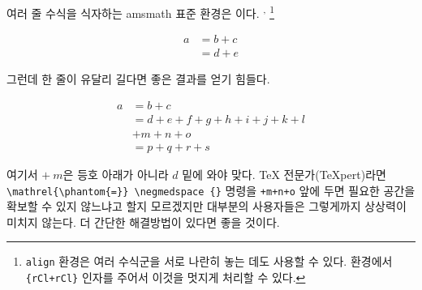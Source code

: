 여러 줄 수식을 식자하는 \textsf{amsmath} 표준 환경은 이다.%
%
\textsuperscript{,}%
\footnote{%
  \texttt{align} 환경은 여러 수식군을 서로 나란히 놓는 데도 사용할 수 있다.
   환경에서 \texttt{\{rCl+rCl\}} 인자를 주어서 이것을 멋지게 처리할 수 있다.
}
\begin{examplek}
\begin{align}
  a & = b + c \\
  & = d + e
\end{align}
\end{examplek}

그런데 한 줄이 유달리 길다면 좋은 결과를 얻기 힘들다.
\begin{examplek}
\begin{align}
  a & = b + c \\
  & = d + e + f + g + h + i 
  + j + k + l \nonumber \\
  & + m + n + o \\
  & = p + q + r + s
\end{align}
\end{examplek}
\noindent 여기서 $+\:m$은 등호 아래가 아니라 $d$ 밑에 와야 맞다. 
\TeX{} 전문가(\TeX{}pert)라면 \verb+\mathrel{\phantom{=}} \negmedspace {}+ 명령을
\verb|+m+n+o| 앞에 두면 필요한 공간을 확보할 수 있지 않느냐고 할지 모르겠지만 대부분의 사용자들은 
그렇게까지 상상력이 미치지 않는다. 더 간단한 해결방법이 있다면 좋을 것이다.

